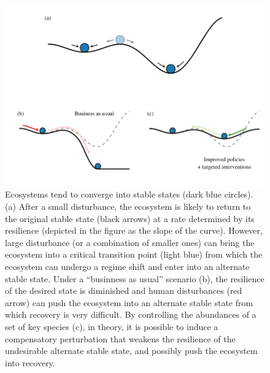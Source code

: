 \documentclass[a4paper]{article}
\begin{document}
\begin{figure}[p]
  \centering
  \includegraphics{critical_tran}
  \caption{
  \label{fig:critical_tran}
  Ecosystems tend to converge into stable states (dark blue circles).
  (a) After a small disturbance, the ecosystem is likely to return to the original stable state (black arrows) at a rate determined by its resilience (depicted in the figure as the slope of the curve).
  However, large disturbance (or a combination of smaller ones) can bring the ecosystem into a critical transition point (light blue) from which the ecosystem can undergo a regime shift and enter into an alternate stable state.
  Under a ``businness as usual'' scenario (b), the resilience of the desired state is diminished and human disturbances (red arrow) can push the ecosystem into an alternate stable state from which recovery is very difficult.
  By controlling the abundances of a set of key species (c), in theory, it is possible to induce a compensatory perturbation that weakens the resilience of the undesirable alternate stable state, and possibly push the ecosystem into recovery.
  }
\end{figure}
\end{document}
